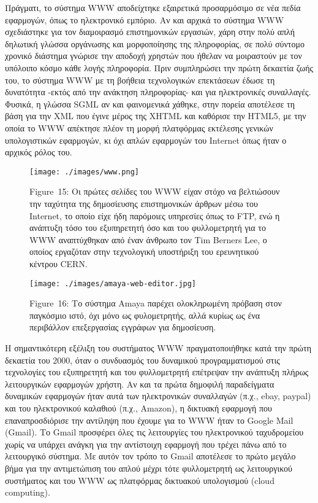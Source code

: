\documentclass[
]{article}
\begin{document}
Πράγματι, το σύστημα WWW αποδείχτηκε εξαιρετικά προσαρμόσιμο σε νέα
πεδία εφαρμογών, όπως το ηλεκτρονικό εμπόριο. Αν και αρχικά το σύστημα
WWW σχεδιάστηκε για τον διαμοιρασμό επιστημονικών εργασιών, χάρη στην
πολύ απλή δηλωτική γλώσσα οργάνωσης και μορφοποίησης της πληροφορίας, σε
πολύ σύντομο χρονικό διάστημα γνώρισε την αποδοχή χρηστών που ήθελαν να
μοιραστούν με τον υπόλοιπο κόσμο κάθε λογής πληροφορία. Πριν συμπληρώσει
την πρώτη δεκαετία ζωής του, το σύστημα WWW με τη βοήθεια τεχνολογικών
επεκτάσεων έδωσε τη δυνατότητα -εκτός από την ανάκτηση πληροφορίας- και
για ηλεκτρονικές συναλλαγές. Φυσικά, η γλώσσα SGML αν και φαινομενικά
χάθηκε, στην πορεία αποτέλεσε τη βάση για την XML που έγινε μέρος της
XHTML και καθόρισε την HTML5, με την οποία το WWW απέκτησε πλέον τη
μορφή πλατφόρμας εκτέλεσης γενικών υπολογιστικών εφαρμογών, κι όχι απλών
εφαρμογών του Internet όπως ήταν ο αρχικός ρόλος του.

\leavevmode{}%
\begin{figure}
\hypertarget{fig:www}{%
\centering
\texttt{[image: ./images/www.png]}
\caption{Figure~15: Οι πρώτες σελίδες του WWW είχαν στόχο να βελτιώσουν
την ταχύτητα της δημοσίευσης επιστημονικών άρθρων μέσω του Internet, το
οποίο είχε ήδη παρόμοιες υπηρεσίες όπως το FTP, ενώ η ανάπτυξη τόσο του
εξυπηρετητή όσο και του φυλλομετρητή για το WWW αναπτύχθηκαν από έναν
άνθρωπο τον Tim Berners Lee, ο οποίος εργαζόταν στην τεχνολογική
υποστήριξη του ερευνητικού κέντρου CERN.}\label{fig:www}
}
\end{figure}

\leavevmode{}%
\begin{figure}
\hypertarget{fig:amaya-web-editor}{%
\centering
\texttt{[image: ./images/amaya-web-editor.jpg]}
\caption{Figure~16: Το σύστημα Amaya παρέχει ολοκληρωμένη πρόβαση στον
παγκόσμιο ιστό, όχι μόνο ως φυλομετρητής, αλλά κυρίως ως ένα περιβάλλον
επεξεργασίας εγγράφων για δημοσίευση.}\label{fig:amaya-web-editor}
}
\end{figure}

Η σημαντικότερη εξέλιξη του συστήματος WWW πραγματοποιήθηκε κατά την
πρώτη δεκαετία του 2000, όταν ο συνδυασμός του δυναμικού προγραμματισμού
στις τεχνολογίες του εξυπηρετητή και του φυλλομετρητή επέτρεψαν την
ανάπτυξη πλήρως λειτουργικών εφαρμογών χρήστη. Αν και τα πρώτα δημοφιλή
παραδείγματα δυναμικών εφαρμογών ήταν αυτά των ηλεκτρονικών συναλλαγών
(π.χ., ebay, paypal) και του ηλεκτρονικού καλαθιού (π.χ., Amazon), η
δικτυακή εφαρμογή που επαναπροσδιόρισε την αντίληψη που έχουμε για το
WWW ήταν το Google Mail (Gmail). Το Gmail προσφέρει όλες τις λειτουργίες
του ηλεκτρονικού ταχυδρομείου χωρίς να υπάρχει ανάγκη για την αντίστοιχη
εφαρμογή που τρέχει πάνω από το λειτουργικό σύστημα. Με αυτόν τον τρόπο
το Gmail αποτέλεσε το πρώτο μεγάλο βήμα για την αντιμετώπιση του απλού
μέχρι τότε φυλλομετρητή ως λειτουργικού συστήματος και του WWW ως
πλατφόρμας δικτυακού υπολογισμού (cloud computing).
\end{document}
